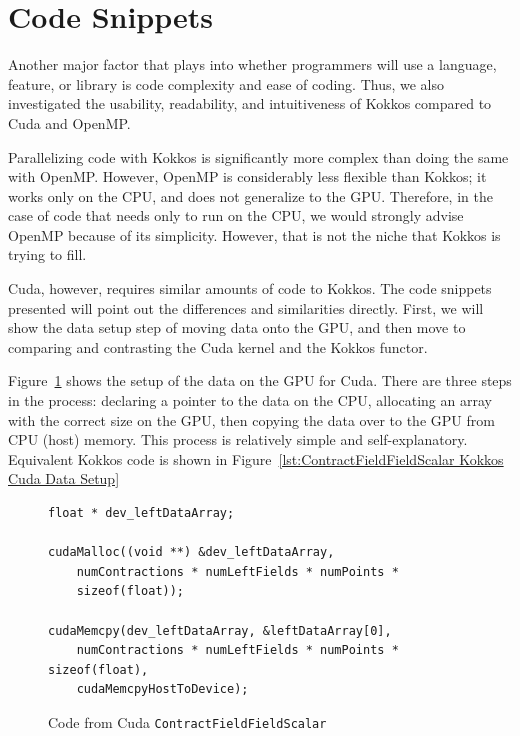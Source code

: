 \section{Code Snippets}
Another major factor that plays into whether programmers will use a language,
feature, or library is code complexity and ease of coding. Thus, we also
investigated the usability, readability, and intuitiveness of Kokkos compared to
Cuda and OpenMP.

Parallelizing code with Kokkos is significantly more complex than doing the same
with OpenMP.  However, OpenMP is considerably less flexible than Kokkos; it
works only on the CPU, and does not generalize to the GPU.  Therefore, in the
case of code that needs only to run on the CPU, we would strongly advise OpenMP
because of its simplicity.  However, that is not the niche that Kokkos is trying
to fill. 

Cuda, however, requires similar amounts of code to Kokkos.  The code snippets
presented will point out the differences and similarities directly.  First, we
will show the data setup step of moving data onto the GPU, and then move to
comparing and contrasting the Cuda kernel and the Kokkos functor.

Figure~\ref{lst:ContractFieldFieldScalar Cuda Data Setup} shows the setup of the data on the GPU for Cuda. 
There are three steps in the process: declaring a pointer to the data on the
CPU, allocating an array with the correct size on the GPU, then copying the data
over to the GPU from CPU (host) memory. This process is relatively simple and
self-explanatory. 
Equivalent Kokkos code is shown in Figure~\ref{lst:ContractFieldFieldScalar
Kokkos Cuda Data Setup}

\begin{figure}[!htb]
	\begin{lstlisting}
float * dev_leftDataArray;

cudaMalloc((void **) &dev_leftDataArray, 
	numContractions * numLeftFields * numPoints * 
	sizeof(float));
	
cudaMemcpy(dev_leftDataArray, &leftDataArray[0], 
	numContractions * numLeftFields * numPoints * sizeof(float), 
	cudaMemcpyHostToDevice);
	\end{lstlisting}

\caption{Code from Cuda \texttt{ContractFieldFieldScalar}
\label{lst:ContractFieldFieldScalar Cuda Data Setup}}
\end{figure}


